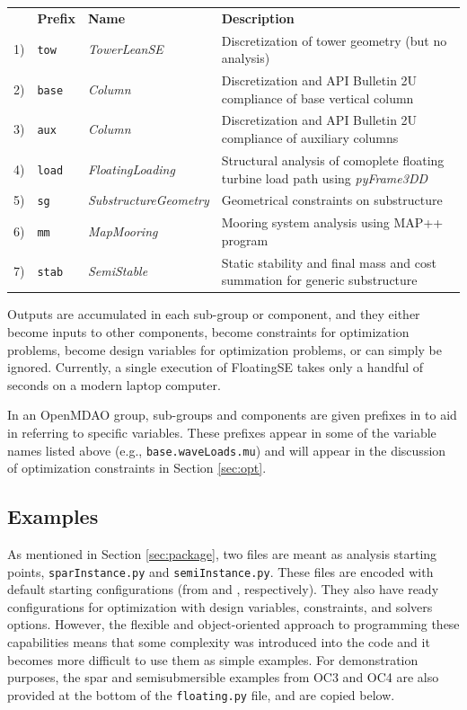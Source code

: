 {\small
  \begin{tabularx}{\linewidth}{ l l l X }
    &  \textbf{Prefix} & \textbf{Name} & \textbf{Description} \\
    1) & \texttt{tow} & \textit{TowerLeanSE} & Discretization of tower
    geometry (but no analysis) \\
    2) & \texttt{base} & \textit{Column} & Discretization and API
    Bulletin 2U compliance of base vertical column \\
    3) & \texttt{aux} & \textit{Column} & Discretization and API
    Bulletin 2U compliance of auxiliary columns \\
    4) & \texttt{load} & \textit{FloatingLoading} & Structural analysis
    of comoplete floating turbine load path using \textit{pyFrame3DD} \\
    5) & \texttt{sg} & \textit{SubstructureGeometry} & Geometrical constraints
    on substructure \\
    6) & \texttt{mm} & \textit{MapMooring} & Mooring system analysis using MAP++ program \\
    7) & \texttt{stab} & \textit{SemiStable} & Static stability and final mass and cost summation for generic substructure \\
  \end{tabularx}
}

Outputs are accumulated in each sub-group or component,
and they either become inputs to other components, become constraints
for optimization problems, become design variables for optimization
problems, or can simply be ignored.  Currently, a single execution of
FloatingSE takes only a handful of seconds on a modern laptop computer.

In an OpenMDAO group, sub-groups and components are given prefixes in to
aid in referring to specific variables.  These prefixes appear in some
of the variable names listed above (e.g., \texttt{base.waveLoads.mu})
and will appear in the discussion of optimization constraints in Section
\ref{sec:opt}.

\subsection{Examples}
As mentioned in Section \ref{sec:package}, two files are meant as
analysis starting points, \texttt{sparInstance.py} and
\texttt{semiInstance.py}.  These files are encoded with default starting
configurations (from \citet{OC3} and \citet{OC4}, respectively).  They
also have ready configurations for optimization with design variables,
constraints, and solvers options.  However, the flexible and
object-oriented approach to programming these capabilities means that
some complexity was introduced into the code and it becomes more
difficult to use them as simple examples.  For demonstration purposes,
the spar and semisubmersible examples from OC3 and OC4 are also provided
at the bottom of the \texttt{floating.py} file, and are copied below.

